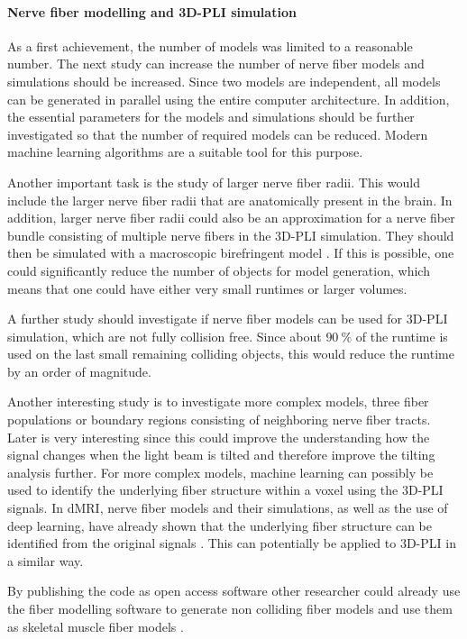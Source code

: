 \paragraph{Nerve fiber modelling and \ac{3D-PLI} simulation}
% 
As a first achievement, the number of models was limited to a reasonable number.
The next study can increase the number of nerve fiber models and simulations should be increased.
Since two models are independent, all models can be generated in parallel using the entire computer architecture.
In addition, the essential parameters for the models and simulations should be further investigated so that the number of required models can be reduced.
Modern machine learning algorithms are a suitable tool for this purpose.
\par
% 
Another important task is the study of larger nerve fiber radii.
This would include the larger nerve fiber radii that are anatomically present in the brain.
In addition, larger nerve fiber radii could also be an approximation for a nerve fiber bundle consisting of multiple nerve fibers in the \ac{3D-PLI} simulation.
They should then be simulated with a macroscopic birefringent model \cite{Menzel2015}.
If this is possible, one could significantly reduce the number of objects for model generation, which means that one could have either very small runtimes or larger volumes.
\par
% 
A further study should investigate if nerve fiber models can be used for \ac{3D-PLI} simulation, which are not fully collision free.
Since about $\SI{90}{\percent}$ of the runtime is used on the last small remaining colliding objects, this would reduce the runtime by an order of magnitude.
\par
% 
Another interesting study is to investigate more complex models, \eg{} three fiber populations or boundary regions consisting of neighboring nerve fiber tracts.
Later is very interesting since this could improve the understanding how the signal changes when the light beam is tilted and therefore improve the tilting analysis further.
For more complex models, machine learning can possibly be used to identify the underlying fiber structure within a voxel using the \ac{3D-PLI} signals. 
In \ac{dMRI}, nerve fiber models and their simulations, as well as the use of deep learning, have already shown that the underlying fiber structure can be identified from the original signals \cite{ginsburgerDis2019}.
This can potentially be applied to \ac{3D-PLI} in a similar way.
\par
% 
By publishing the code as open access software other researcher could already use the fiber modelling software to generate non colliding fiber models and use them as skeletal muscle fiber models \cite{Ji2021}.